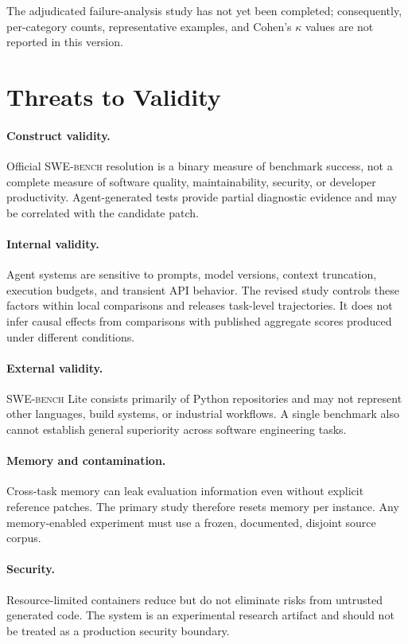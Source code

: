 \documentclass[journal]{IEEEtran}
\newcommand{\swebench}{\textsc{SWE-bench}}
\begin{document}
The adjudicated failure-analysis study has not yet been completed; consequently, per-category counts, representative examples, and Cohen's $\kappa$ values are not reported in this version.

\section{Threats to Validity}
\label{sec:threats}

\paragraph{Construct validity.}
Official \swebench{} resolution is a binary measure of benchmark success, not a complete measure of software quality, maintainability, security, or developer productivity. Agent-generated tests provide partial diagnostic evidence and may be correlated with the candidate patch.

\paragraph{Internal validity.}
Agent systems are sensitive to prompts, model versions, context truncation, execution budgets, and transient API behavior. The revised study controls these factors within local comparisons and releases task-level trajectories. It does not infer causal effects from comparisons with published aggregate scores produced under different conditions.

\paragraph{External validity.}
\swebench{} Lite consists primarily of Python repositories and may not represent other languages, build systems, or industrial workflows. A single benchmark also cannot establish general superiority across software engineering tasks.

\paragraph{Memory and contamination.}
Cross-task memory can leak evaluation information even without explicit reference patches. The primary study therefore resets memory per instance. Any memory-enabled experiment must use a frozen, documented, disjoint source corpus.

\paragraph{Security.}
Resource-limited containers reduce but do not eliminate risks from untrusted generated code. The system is an experimental research artifact and should not be treated as a production security boundary.
\end{document}
